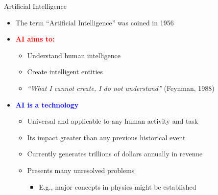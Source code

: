 \documentclass[
  10pt,
  ignorenonframetext,
]{beamer}
\providecommand{\tightlist}{%
  \setlength{\itemsep}{0pt}\setlength{\parskip}{0pt}}
\begin{document}
\begin{frame}{Artificial Intelligence}
\label{artificial-intelligence}
\begin{itemize}
\item
  The term ``Artificial Intelligence'' was coined in 1956
\item
  \textbf{\textcolor{red}{AI aims to:}}

  \begin{itemize}
  \tightlist
  \item
    Understand human intelligence
  \item
    Create intelligent entities
  \item
    \emph{``What I cannot create, I do not understand''} (Feynman, 1988)
  \end{itemize}
\item
  \textbf{\textcolor{blue}{AI is a technology}}

  \begin{itemize}
  \tightlist
  \item
    Universal and applicable to any human activity and task
  \item
    Its impact greater than any previous historical event
  \item
    Currently generates trillions of dollars annually in revenue
  \item
    Presents many unresolved problems

    \begin{itemize}
    \tightlist
    \item
      E.g., major concepts in physics might be established
    \end{itemize}
  \end{itemize}
\end{itemize}
\end{frame}
\end{document}

